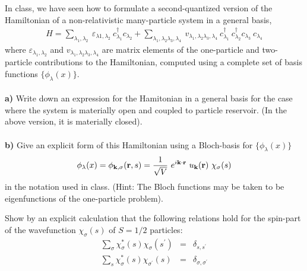 
\begin{problem}
	In class, we have seen how to formulate a second-quantized version of the Hamiltonian of a non-relativistic many-particle system in a general basis,
	\begin{eqnarray}
		H = \sum_{\lambda_1,\lambda_2} ~ \varepsilon_{\lambda1,\lambda_2}~ c^{\dagger}_{\lambda_1}  c_{\lambda_2} 
		+ \sum_{\lambda_1,\lambda_2\lambda_3,\lambda_4}
		~v_{\lambda_1,\lambda_2\lambda_3,\lambda_4}~
		c^{\dagger}_{\lambda_1} ~ c^{\dagger}_{\lambda_2}  c_{\lambda_3} ~ c_{\lambda_4}  \nonumber
	\end{eqnarray}
	where $\varepsilon_{\lambda_1,\lambda_2}$ and $v_{\lambda_1,\lambda_2\lambda_3,\lambda_4}$ are matrix elements of the one-particle and two-particle contributions to the Hamiltonian, computed using a complete set of basis functions $\{ \phi_{\lambda}(x) \}$.
	\ \\
	\ \\
	{\bf a)} Write down an expression for the Hamitonian in a general basis for the case where the system is materially open and coupled to particle reservoir. (In the above version, it is materially closed).
	\ \\
	\ \\
	{\bf b) } Give an explicit form of this   Hamiltonian using a Bloch-basis for $\{ \phi_{\lambda}(x) \}$
	\begin{eqnarray}
		\phi_{\lambda}(x) = \phi_{{\bf k},\sigma}({\bf r},s)  = \frac{1}{\sqrt{V}} ~e^{i {\bf k} \cdot {\bf r}} ~ u_{\bf k} ({\bf r}) ~ \chi_{\sigma}(s) \nonumber
	\end{eqnarray}
	in the notation used in class. (Hint: The Bloch functions may be taken to be eigenfunctions of the one-particle problem). 
\end{problem}
\begin{problem}
	
	Show by an explicit calculation that the following relations hold for the spin-part of the wavefunction $\chi_\sigma(s)$ of $S=1/2$ particles:
	\begin{eqnarray}
		\sum_{\sigma} \chi^*_\sigma(s)  \chi_\sigma(s^{\prime}) & = & \delta_{s,s^{\prime}} \nonumber \\
		\sum_{s} \chi^*_\sigma(s)  \chi_{\sigma^{\prime}}(s) & = & \delta_{\sigma,\sigma^{\prime}} \nonumber
	\end{eqnarray}
\end{problem}
